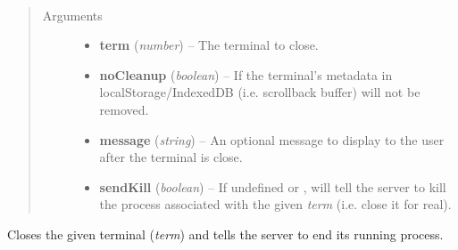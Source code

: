 \documentclass[letterpaper,10pt,openany]{sphinxmanual}
\begin{document}
\begin{fulllineitems}
\label{Applications/terminal/js_terminal:GateOne.Terminal.closeTerminal}~\begin{quote}\begin{description}
\item[{Arguments}] \leavevmode\begin{itemize}
\item {} 
\textbf{term} (\emph{number}) -- The terminal to close.

\item {} 
\textbf{noCleanup} (\emph{boolean}) -- If  the terminal's metadata in localStorage/IndexedDB (i.e. scrollback buffer) will not be removed.

\item {} 
\textbf{message} (\emph{string}) -- An optional message to display to the user after the terminal is close.

\item {} 
\textbf{sendKill} (\emph{boolean}) -- If undefined or , will tell the server to kill the process associated with the given \emph{term} (i.e. close it for real).

\end{itemize}

\end{description}\end{quote}

Closes the given terminal (\emph{term}) and tells the server to end its running process.

\end{fulllineitems}

\end{document}
